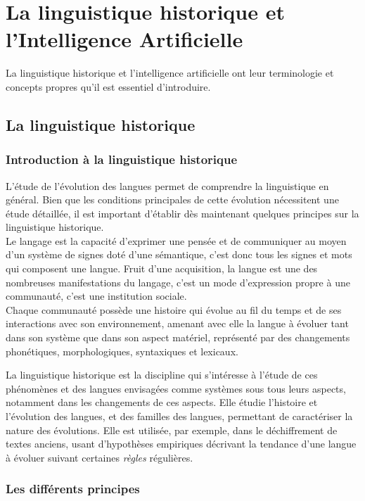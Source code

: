 \documentclass[12pt, twoside]{report}
\begin{document}
\chapter{La linguistique historique et l'Intelligence Artificielle}

La linguistique historique et l'intelligence artificielle ont leur terminologie et concepts propres qu'il est essentiel d'introduire.

\section{La linguistique historique}
\subsection{Introduction à la linguistique historique}

L'étude de l'évolution des langues permet de comprendre la linguistique en général. Bien que les conditions principales de cette évolution nécessitent une étude détaillée, il est important d'établir dès maintenant quelques principes sur la linguistique historique.\\

Le langage est la capacité d'exprimer une pensée et de communiquer au moyen d'un système de signes doté d'une sémantique, c'est donc tous les signes et mots qui composent une langue. Fruit d'une acquisition, la langue est une des nombreuses manifestations du langage, c'est un mode d'expression propre à une communauté, c'est une institution sociale.\\
Chaque communauté possède une histoire qui évolue au fil du temps et de ses interactions avec son environnement, amenant avec elle la langue à évoluer tant dans son système que dans son aspect matériel, représenté par des changements phonétiques, morphologiques, syntaxiques et lexicaux.

La linguistique historique est la discipline qui s'intéresse à l'étude de ces phénomènes et des langues envisagées comme systèmes sous tous leurs aspects, notamment dans les changements de ces aspects. Elle étudie l'histoire et l'évolution des langues, et des familles des langues, permettant de caractériser la nature des évolutions. Elle est utilisée, par exemple, dans le déchiffrement de textes anciens, usant d'hypothèses empiriques décrivant la tendance d'une langue à évoluer suivant certaines \textit{règles} régulières.\\

\subsection{Les différents principes} \label{principesLinguistique}
\end{document}
